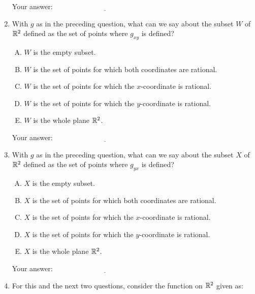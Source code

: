 \documentclass[10pt]{amsart}
\begin{document}
\begin{enumerate}
  \vspace{0.05in}
  Your answer: $\underline{\qquad\qquad\qquad\qquad\qquad\qquad\qquad}$
  \vspace{0.05in}

\item With $g$ as in the preceding question, what can we say about the
  subset $W$ of $\mathbb{R}^2$ defined as the set of points where $g_{xy}$ is
  defined?

  \begin{enumerate}[(A)]
  \item $W$ is the empty subset.
  \item $W$ is the set of points for which both coordinates are rational.
  \item $W$ is the set of points for which the $x$-coordinate is rational.
  \item $W$ is the set of points for which the $y$-coordinate is rational.
  \item $W$ is the whole plane $\mathbb{R}^2$.
  \end{enumerate}

  \vspace{0.05in}
  Your answer: $\underline{\qquad\qquad\qquad\qquad\qquad\qquad\qquad}$
  \vspace{0.05in}

\item With $g$ as in the preceding question, what can we say about the
  subset $X$ of $\mathbb{R}^2$ defined as the set of points where $g_{yx}$ is
  defined?

  \begin{enumerate}[(A)]
  \item $X$ is the empty subset.
  \item $X$ is the set of points for which both coordinates are rational.
  \item $X$ is the set of points for which the $x$-coordinate is rational.
  \item $X$ is the set of points for which the $y$-coordinate is rational.
  \item $X$ is the whole plane $\mathbb{R}^2$.
  \end{enumerate}

  \vspace{0.05in}
  Your answer: $\underline{\qquad\qquad\qquad\qquad\qquad\qquad\qquad}$
  \vspace{0.05in}

\item For this and the next two questions, consider the function on
  $\mathbb{R}^2$ given as:


\end{enumerate}
\end{document}
